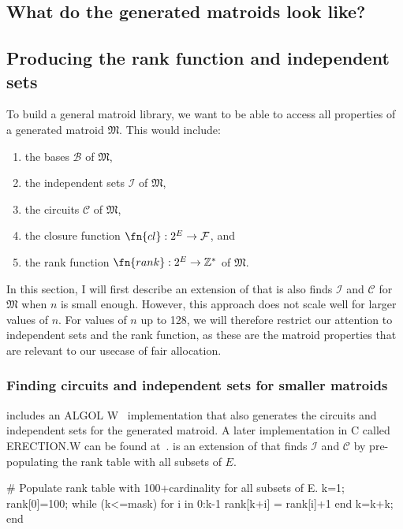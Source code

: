 \skelpars[7]

\subsection{What do the generated matroids look like?}

\subsection{Producing the rank function and independent sets}
To build a general matroid library, we want to be able to access all properties of a generated matroid $\mathfrak{M}$. This would include:
\begin{enumerate}
  \item the bases $\mathcal{B}$ of $\mathfrak{M}$,
  \item the independent sets $\mathcal{I}$ of $\mathfrak{M}$,
  \item the circuits $\mathcal{C}$ of $\mathfrak{M}$,
  \item the closure function $\fn{cl} : 2^E \to \mathcal{F}$, and
  \item the rank function $\fn{rank} : 2^E \to \mathbb{Z}^*$ of $\mathfrak{M}$.
\end{enumerate}

In this section, I will first describe an extension of  that is also finds $\mathcal{I}$ and $\mathcal{C}$ for $\mathfrak{M}$ when $n$ is small enough. However, this approach does not scale well for larger values of $n$. For values of $n$ up to 128, we will therefore restrict our attention to independent sets and the rank function, as these are the matroid properties that are relevant to our usecase of fair allocation.

\subsubsection{Finding circuits and independent sets for smaller matroids}
\cite{knuth-1975} includes an ALGOL W~\cite{wirth-1966} implementation that also generates the circuits and independent sets for the generated matroid. A later implementation in C called ERECTION.W can be found at~\cite{knuth-2003}.  is an extension of  that finds $\mathcal{I}$ and $\mathcal{C}$ by pre-populating the rank table with all subsets of $E$.
\begin{jllisting}
  # Populate rank table with 100+cardinality for all subsets of E.
  k=1; rank[0]=100;
  while (k<=mask)
    for i in 0:k-1 rank[k+i] = rank[i]+1 end
    k=k+k;
  end
\end{jllisting}

